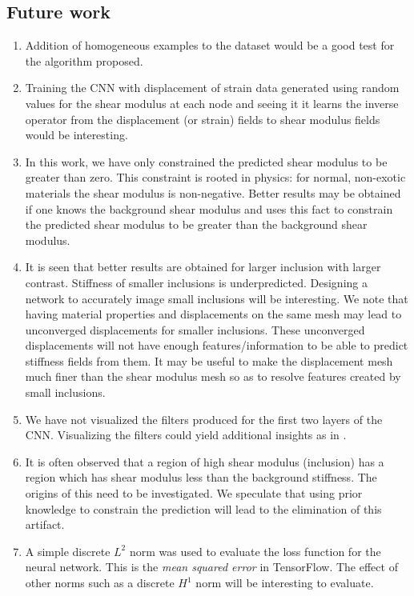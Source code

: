\documentclass[12pt]{article}
\begin{document}
\subsection{Future work}
\begin{enumerate}
\item{Addition of homogeneous examples to the dataset would be a good test for the algorithm proposed.}
\item{Training the CNN with displacement of strain data generated using random values for the shear modulus at each node and seeing it it learns the inverse operator from the displacement (or strain) fields to shear modulus fields would be interesting. }
\item{In this work, we have only constrained the predicted shear modulus to be greater than zero. This constraint is rooted in physics: for normal, non-exotic materials the shear modulus is non-negative. Better results may be obtained if one knows the background shear modulus and uses this fact to constrain the predicted shear modulus to be greater than the background shear modulus.}
\item{It is seen that better results are obtained for larger inclusion with larger contrast. Stiffness of smaller inclusions is underpredicted. Designing a network to accurately image small inclusions will be interesting. We note that having material properties and displacements on the same mesh may lead to unconverged displacements for smaller inclusions. These unconverged displacements will not have enough features/information to be able to predict stiffness fields from them. It may be useful to make the displacement mesh much finer than the shear modulus mesh so as to resolve features created by small inclusions.}
\item{We have not visualized the filters produced for the first two layers of the CNN. Visualizing the filters could yield additional insights as in \cite{paper:pateloberai2019}.}
\item{It is often observed that a region of high shear modulus (inclusion) has a region which has shear modulus less than the background stiffness. The origins of this need to be investigated. We speculate that using prior knowledge to constrain the prediction will lead to the elimination of this artifact.}
\item{A simple discrete $L^2$ norm was used to evaluate the loss function for the neural network. This is the \textit{mean squared error} in TensorFlow. The effect of other norms such as a discrete $H^1$ norm will be interesting to evaluate.}

\end{enumerate}
\end{document}
